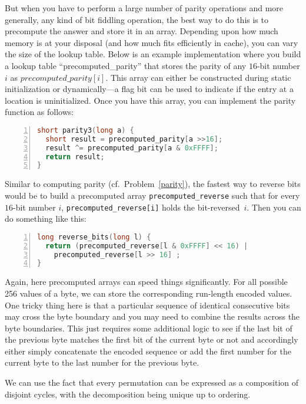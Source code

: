 But when you have to perform a large number of parity operations and more generally,
any kind of bit fiddling operation, the best way to do this is to precompute the
answer and store it in an array.
Depending upon how much memory is at your disposal (and how much fits 
efficiently in cache), you can vary the size of the lookup table. Below is an example
implementation where you build a lookup table ``precomputed\_parity''
that stores the parity of any $16$-bit number $i$ as
$precomputed\_parity[i]$. This array can either be constructed during
static initialization or dynamically---a flag bit can be used
to indicate if the entry at a location is uninitialized.
Once you have this array, you can implement the parity function as follows:
\begin{lstlisting}[basicstyle=\footnotesize,numbers=left,breaklines=true,language=C++]
short parity3(long a) {
  short result = precomputed_parity[a >>16];
  result ^= precomputed_parity[a & 0xFFFF];
  return result;
}
\end{lstlisting}


Similar to computing parity (cf.~Problem~\ref{parity}), the fastest way 
to reverse bits would be to build a precomputed array \texttt{precomputed\_reverse}
such that for every $16$-bit number $i$,  \texttt{precomputed\_reverse[i]} holds the bit-reversed~$i$.
Then you can do something like this:
\begin{lstlisting}[basicstyle=\footnotesize,numbers=left,breaklines=true,language=C++]
long reverse_bits(long l) {
  return (precomputed_reverse[l & 0xFFFF] << 16) |
    precomputed_reverse[l >> 16] ;
}
\end{lstlisting}
 
Again, here precomputed arrays can speed things significantly.
For all possible 256 values of a byte, we can store the corresponding
run-length encoded values.  One tricky thing here is that a particular
sequence of identical consecutive bits may cross the byte boundary  and you may need to combine the results
across the byte boundaries. This just requires some additional logic
to see if the last bit of the previous byte matches the first bit of the
current byte or not and accordingly either simply concatenate the
encoded sequence or add the first number for the current byte to the last
number for the previous byte.

We can use the fact that every permutation
can be expressed as a composition of disjoint cycles, with
the decomposition being unique up to ordering. 

